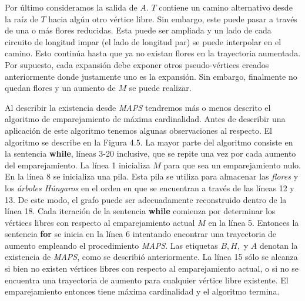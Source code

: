 \documentclass[10pt,a5paper]{book}
\begin{document}
Por último consideramos la salida de $A$. $T$ contiene un camino alternativo desde la raíz de $T$ hacia algún otro vértice libre. Sin embargo, este puede pasar a través de una o más flores reducidas. Esta puede ser ampliada y un lado de cada circuito de longitud impar (el lado de longitud par) se puede interpolar en el camino. Esto continúa hasta que ya no existan flores en la trayectoria aumentada. Por supuesto, cada expansión debe exponer otros pseudo-vértices creados anteriormente donde justamente uno es la expansión. Sin embargo, finalmente no quedan flores y un aumento de $M$ se puede realizar.

Al describir la existencia desde \emph{MAPS} tendremos más o menos descrito el algoritmo de emparejamiento de máxima cardinalidad. Antes de describir una aplicación de este algoritmo tenemos algunas observaciones al respecto. El algoritmo se describe en la Figura 4.5. La mayor parte del algoritmo consiste en la sentencia \textbf{while}, líneas 3-20 inclusive, que se repite una vez por cada aumento del emparejamiento. La línea 1 inicializa $M$ para que sea un emparejamiento nulo. En la línea 8 se inicializa una pila. Esta pila se utiliza para almacenar las \emph{flores} y los \emph{árboles Húngaros} en el orden en que se encuentran a través de las líneas 12 y 13. De este modo, el grafo puede ser adecuadamente reconstruido dentro de la línea 18. Cada iteración de la sentencia \textbf{while} comienza por determinar los vértices libres con respecto al emparejamiento actual $M$ en la línea 5. Entonces la sentencia \textbf{for} se inicia en la línea 6 intentando encontrar una trayectoria de aumento empleando el procedimiento \emph{MAPS}. Las etiquetas $B, H,$ y $A$ denotan la existencia de \emph{MAPS}, como se describió anteriormente. La línea 15 sólo se alcanza si bien no existen vértices libres con respecto al emparejamiento actual, o si no se encuentra  una trayectoria de aumento para cualquier vértice libre existente. El emparejamiento entonces tiene máxima cardinalidad y el algoritmo termina.
\end{document}
